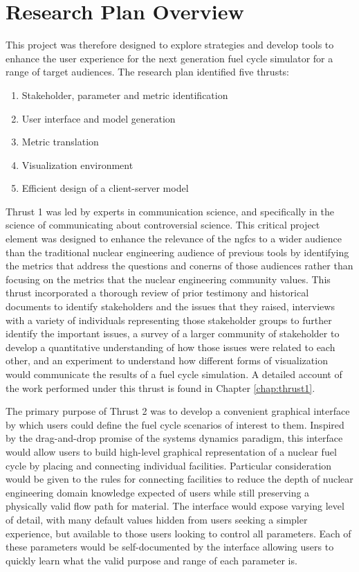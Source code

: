 \section{Research Plan Overview}

This project was therefore designed to explore strategies and develop tools to
enhance the user experience for the next generation fuel cycle simulator for a
range of target audiences.  The research plan identified five thrusts:
\begin{enumerate}
  \item Stakeholder, parameter and metric identification
  \item User interface and model generation
  \item Metric translation
  \item Visualization environment
  \item Efficient design of a client-server model
\end{enumerate}

Thrust 1 was led by experts in communication science, and specifically in the
science of communicating about controversial science.  This critical project
element was designed to enhance the relevance of the \gls{ngfcs} to a wider
audience than the traditional nuclear engineering audience of previous tools
by identifying the metrics that address the questions and conerns of those
audiences rather than focusing on the metrics that the nuclear engineering
community values.  This thrust incorporated a thorough review of prior
testimony and historical documents to identify stakeholders and the issues
that they raised, interviews with a variety of individuals representing those
stakeholder groups to further identify the important issues, a survey of a
larger community of stakeholder to develop a quantitative understanding of how
those issues were related to each other, and an experiment to understand how
different forms of visualization would communicate the results of a fuel cycle
simulation.  A detailed account of the work performed under this thrust is
found in Chapter \ref{chap:thrust1}.

The primary purpose of Thrust 2 was to develop a convenient graphical
interface by which users could define the fuel cycle scenarios of interest to
them.  Inspired by the drag-and-drop promise of the systems dynamics paradigm,
this interface would allow users to build high-level graphical representation
of a nuclear fuel cycle by placing and connecting individual facilities.
Particular consideration would be given to the rules for connecting facilities
to reduce the depth of nuclear engineering domain knowledge expected of users
while still preserving a physically valid flow path for material.  The
interface would expose varying level of detail, with many default values
hidden from users seeking a simpler experience, but available to those users
looking to control all parameters.  Each of these parameters would be
self-documented by the interface allowing users to quickly learn what the
valid purpose and range of each parameter is.
